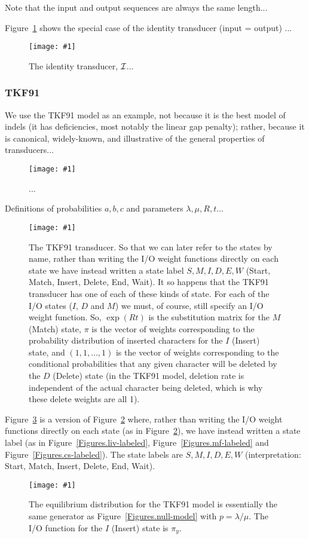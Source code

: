 \documentclass{article}
\newcommand{\figref}[1]{Figure~\ref{Figures.#1}}
\newcommand{\figlabel}[1]{\label{Figures.#1}}
\newcommand{\easyfig}[4]{
\begin{figure}
\texttt{[image: \#1]}
\caption{ \figlabel{#3} #4}
\end{figure}}
\newcommand{\pdffig}[2]{\easyfig{#1-fig.pdf}{}{#1}{#2}}
\newcommand\identity{{\cal I}}
\begin{document}
Note that the input and output sequences are always the same length...

\figref{identity} shows the special case of the identity transducer (input = output) ...
\pdffig{identity}{The identity transducer, $\identity$...}


\subsubsection{TKF91}

We use the TKF91 model as an example, not because it is the best model of indels
 (it has deficiencies, most notably the linear gap penalty);
rather, because it is canonical, widely-known, and illustrative of the general properties of transducers...

\pdffig{tkf91}{...}

Definitions of probabilities $a,b,c$ and parameters $\lambda,\mu,R,t$...

\pdffig{tkf91-labeled}{
The TKF91 transducer.
So that we can later refer to the states by name,
rather than writing the I/O weight functions directly on each state
we have instead written a state label
 $S,M,I,D,E,W$ (Start, Match, Insert, Delete, End, Wait).
It so happens that the TKF91 transducer has one of each of these kinds of state.
For each of the I/O states ($I$, $D$ and $M$) we must, of course, still specify an I/O weight function.
So,
 $\exp(Rt)$ is the substitution matrix for the $M$ (Match) state,
 $\pi$ is the vector of weights
  corresponding to the probability distribution of inserted characters for the $I$ (Insert) state,
 and
 $(1,1,\ldots,1)$
 is the vector of weights corresponding to
 the conditional probabilities that any given character will be deleted by the $D$ (Delete) state
 (in the TKF91 model, deletion rate is independent of the actual character being deleted,
 which is why these delete weights are all 1).
}

\figref{tkf91-labeled} is a version of \figref{tkf91}
where, rather than writing the I/O weight functions directly on each state (as in \figref{tkf91}),
we have instead written a state label (as in \figref{liv-labeled}, \figref{mf-labeled} and \figref{cs-labeled}).
The state labels are $S,M,I,D,E,W$ (interpretation: Start, Match, Insert, Delete, End, Wait).

\pdffig{tkf91-root}{The equilibrium distribution for the TKF91 model is essentially the same generator as \figref{null-model} with $p=\lambda/\mu$.
The I/O function for the $I$ (Insert) state is $\pi_y$.}
\end{document}
